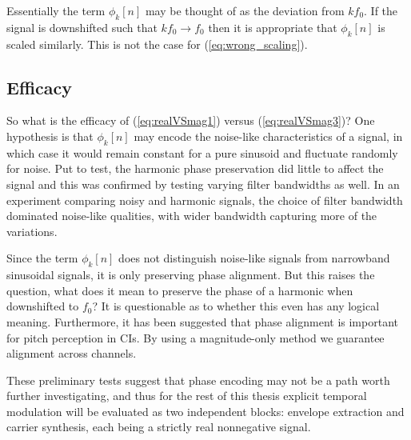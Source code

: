 \documentclass [11pt, proquest,oneside] {ganter_thesis}[2015/03/03]
\begin{document}
Essentially the term $\phi_k[n]$ may be thought of as the deviation from $kf_0$.  If the signal is downshifted such that $kf_0 \longrightarrow f_0$ then it is appropriate that $\phi_k[n]$ is scaled similarly.  This is not the case for (\ref{eq:wrong_scaling}).

\subsection{Efficacy}

So what is the efficacy of (\ref{eq:realVSmag1}) versus (\ref{eq:realVSmag3})?  One hypothesis is that $\phi_k[n]$ may encode the noise-like characteristics of a signal, in which case it would remain constant for a pure sinusoid and fluctuate randomly for noise.  Put to test, the harmonic phase preservation did little to affect the signal and this was confirmed by testing varying filter bandwidths as well.  In an experiment comparing noisy and harmonic signals, the choice of filter bandwidth dominated noise-like qualities, with wider bandwidth capturing more of the variations.

Since the term $\phi_k[n]$ does not distinguish noise-like signals from narrowband sinusoidal signals, it is only preserving phase alignment.  But this raises the question, what does it mean to preserve the phase of a harmonic when downshifted to $f_0$?  It is questionable as to whether this even has any logical meaning.  Furthermore, it has been suggested \cite{laneau2006improved} that phase alignment is important for pitch perception in CIs.  By using a magnitude-only method we guarantee alignment across channels.




These preliminary tests suggest that phase encoding may not be a path worth further investigating, and thus for the rest of this thesis explicit temporal modulation will be evaluated as two independent blocks: envelope extraction and carrier synthesis, each being a strictly real nonnegative signal.
\end{document}
